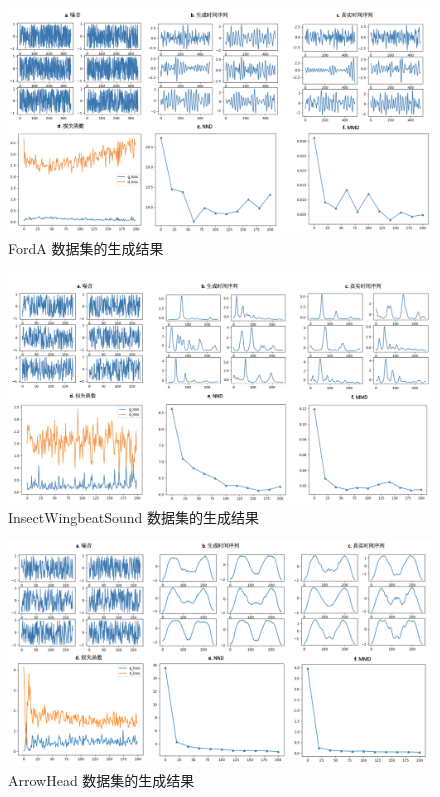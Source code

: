 \begin{figure}[H]
\centering
\includegraphics[scale=0.5]{figures/gan/FordA.png}
\caption{FordA 数据集的生成结果}
\label{fig:gan-show-FordA}
\end{figure}
\begin{figure}[H]
\centering
\includegraphics[scale=0.5]{figures/gan/InsectWingbeatSound.png}
\caption{InsectWingbeatSound 数据集的生成结果}
\label{fig:gan-show-InsectWingbeatSound}
\end{figure}
\begin{figure}[H]
\centering
\includegraphics[scale=0.5]{figures/gan/ArrowHead.png}
\caption{ArrowHead 数据集的生成结果}
\label{fig:gan-show-ArrowHead}
\end{figure}
